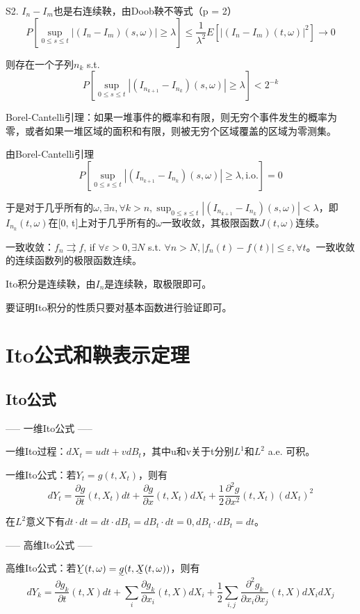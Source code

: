 S2. $I_n - I_m$也是右连续鞅，由Doob鞅不等式（p = 2）
\[
  P\left[\sup_{0 \le s \le t}|(I_n - I_m)(s, \omega)| \geq \lambda\right] \le \frac{1}{\lambda^{2}} E\left[|(I_n - I_m)(t, \omega)|^{2}\right] \to 0
\]

则存在一个子列$n_k$ s.t.
\[
  P\left[\sup_{0 \le s \le t}|(I_{n_{k + 1}} - I_{n_k})(s, \omega)| \ge \lambda\right] < 2^{-k}
\]

Borel-Cantelli引理：如果一堆事件的概率和有限，则无穷个事件发生的概率为零，或者如果一堆区域的面积和有限，则被无穷个区域覆盖的区域为零测集。

由Borel-Cantelli引理
\[
  P\left[\sup_{0 \le s \le t}|(I_{n_{k + 1}} - I_{n_k})(s, \omega)| \geq \lambda, \text{i.o.}\right] = 0
\]

于是对于几乎所有的$\omega, \exists n, \forall k > n, \sup_{0 \le s \le t}|(I_{n_{k + 1}} - I_{n_k})(s, \omega)| < \lambda$，即$I_{n_k}(t, \omega)$在[0, t]上对于几乎所有的$\omega$一致收敛，其极限函数$J(t, \omega)$连续。

一致收敛：$f_n \rightrightarrows f$, if $\forall \varepsilon > 0, \exists N$ s.t. $\forall n > N, |f_n(t) - f(t)| \le \varepsilon, \forall t$。一致收敛的连续函数列的极限函数连续。

Ito积分是连续鞅，由$I_n$是连续鞅，取极限即可。

要证明Ito积分的性质只要对基本函数进行验证即可。

\section{Ito公式和鞅表示定理}

\subsection{Ito公式}

----- 一维Ito公式 -----

一维Ito过程：$dX_t = udt + vdB_t$，其中u和v关于t分别$L^1$和$L^2$ a.e. 可积。

一维Ito公式：若$Y_t = g(t, X_t)$，则有
\[
  d Y_{t}=\frac{\partial g}{\partial t}(t, X_{t}) d t+\frac{\partial g}{\partial x}(t, X_{t}) d X_{t}+\frac{1}{2} \frac{\partial^{2} g}{\partial x^{2}}(t, X_{t})(d X_{t})^{2}
\]

在$L^2$意义下有$d t \cdot d t=d t \cdot d B_{t}=d B_{t} \cdot d t=0,  d B_{t} \cdot d B_{t}=d t$。

----- 高维Ito公式 -----

高维Ito公式：若$\undertilde{Y}(t, \omega) = \undertilde{g}(t, \undertilde{X}(t, \omega))$，则有
\[
  d Y_{k}=\frac{\partial g_{k}}{\partial t}(t, X) d t+\sum_{i} \frac{\partial g_{k}}{\partial x_{i}}(t, X) d X_{i}+\frac{1}{2} \sum_{i, j} \frac{\partial^{2} g_{k}}{\partial x_{i} \partial x_{j}}(t, X) d X_{i} d X_{j}
\]

